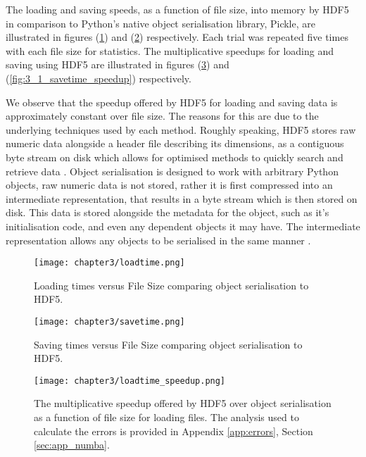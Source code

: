 The loading and saving speeds, as a function of file size, into memory by
HDF5 in comparison to Python's native object serialisation library, Pickle,
are illustrated in figures (\ref{fig:3_1_loadtime}) and (\ref{fig:3_1_savetime})
respectively. Each trial was repeated five times with each file size for statistics.
The multiplicative speedups for loading and saving using HDF5 are illustrated
in figures (\ref{fig:3_1_loadtime_speedup}) and (\ref{fig:3_1_savetime_speedup})
respectively.

We observe that the speedup offered by HDF5 for loading and saving
data is approximately constant over file size. The reasons for this are due to the underlying
techniques used by each method. Roughly speaking, HDF5 stores raw numeric data
alongside a header file describing its dimensions, as a contiguous byte stream
on disk which allows for optimised methods to quickly search and retrieve data
\cite{collette2013python}. Object serialisation is designed to work with arbitrary
Python objects, raw numeric data is not stored, rather it is first compressed
into an intermediate representation, that results in a byte stream which is then
stored on disk. This data is stored alongside the metadata for the object, such
as it's initialisation code, and even any dependent objects it may have. The
intermediate representation allows any objects to be serialised in the same
manner \cite{pickle}.

\begin{figure}
    \centering

  {\texttt{[image: chapter3/loadtime.png]}}
  \vspace{0pt}
    \caption{
        Loading times versus File Size comparing object serialisation to HDF5.
    }
    \label{fig:3_1_loadtime}
\end{figure}


\begin{figure}
    \centering

  {\texttt{[image: chapter3/savetime.png]}}
  \vspace{0pt}
    \caption{
        Saving times versus File Size comparing object serialisation to HDF5.
    }
    \label{fig:3_1_savetime}
\end{figure}


\begin{figure}
    \centering

  {\texttt{[image: chapter3/loadtime\_speedup.png]}}
  \vspace{0pt}
    \caption{
        The multiplicative speedup offered by HDF5 over object serialisation
        as a function of file size for loading files.
        The analysis used to calculate the errors is provided in
        Appendix \ref{app:errors}, Section \ref{sec:app_numba}.
    }
    \label{fig:3_1_loadtime_speedup}
\end{figure}


